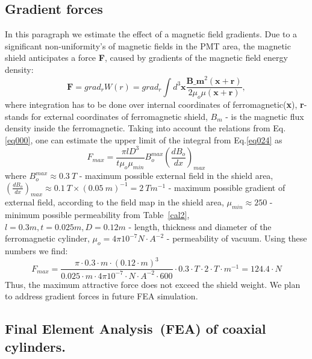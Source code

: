 \documentclass[12pt]{article}
\begin{document}
\subsection{Gradient forces}
In this paragraph we estimate the effect of a magnetic field gradients.
Due to a significant non-uniformity's  of magnetic fields in the PMT area,
the magnetic shield anticipates a  force \textbf{F}, caused
by  gradients of the magnetic field energy density:
\begin{equation}
\textbf{F}=grad_rW(r) = grad_r \int d^3 \textbf{x}
\frac
{ \textbf{B_m}^2({\textbf{x}+\textbf{r}})  }
{ 2\mu_{o}\mu( {\textbf{x}+\textbf{r}}  )  },
\label{eq024}
\end{equation}
where  integration has to be  done over  internal coordinates of
ferromagnetic(\textbf{x}), \textbf{r}- stands for external coordinates
of ferromagnetic shield, $B_m$ - is the magnetic flux density inside the
ferromagnetic.
%
Taking into account the  relations from Eq.\ref{eq000},
one can estimate the upper limit of  the integral from Eq.\ref{eq024} as 
%
\begin{equation}
{F_{max}= \frac{\pi l D^3}{t\mu_{o}\mu_{min}}
B_{o}^{max} ( \frac {dB_o} {dx})_{max}}~~~~~~~~~~~
\label{eq034}
\end{equation}
where 
$B_o^{max}\approx0.3~T$ - maximum  possible external field  in the shield area,
$(\frac{dB_o}{dx})_{max}\approx0.1~T\times(0.05~m)^{-1}=2~Tm^{-1}$ -   maximum 
possible gradient of external field, according to the  field map in the shield  area,
$\mu_{min}\approx250$ -   minimum possible permeability
from Table~\ref{cal2},
 $l=0.3m, t=0.025m, D=0.12m$ - length,  thickness
and diameter of the ferromagnetic cylinder,
$\mu_o = 4\pi 10^{-7}N·A^{-2}$  -  permeability of vacuum.
Using these numbers  we find:
%
\begin{equation}
F_{max}= \frac{\pi \cdot 0.3 \cdot m
\cdot (0.12 \cdot m)^3 }{0.025\cdot m \cdot
4 \pi 10^{-7}\cdot N \cdot A^{-2} \cdot 600} \cdot
0.3 \cdot T \cdot 2 \cdot T\cdot m^{-1}= 124.4 \cdot N
\label{eq035}
\end{equation}
Thus,  the maximum attractive   force
does not exceed the  shield  weight.
We plan  to  address  gradient forces in future   FEA simulation.




\subsection{Final Element Analysis~(FEA) of coaxial cylinders.}
\label{FEA}
\end{document}
